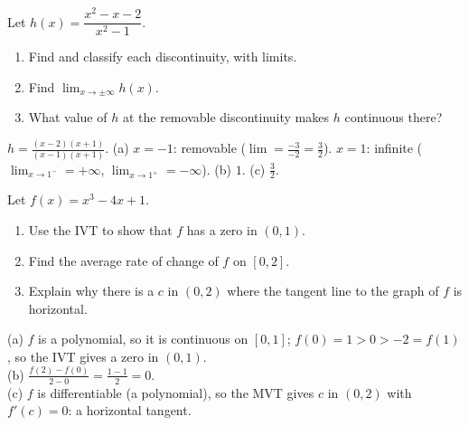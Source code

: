\begin{exo}{}
Let $h(x)=\dfrac{x^2-x-2}{x^2-1}$.
\begin{enumerate}[label=(\alph*)]
\item Find and classify each discontinuity, with limits.
\item Find $\lim_{x\to\pm\infty}h(x)$.
\item What value of $h$ at the removable discontinuity makes $h$ continuous there?
\end{enumerate}
\work{3.5cm}
\begin{solution}
$h=\frac{(x-2)(x+1)}{(x-1)(x+1)}$. (a) $x=-1$: removable ($\lim=\frac{-3}{-2}=\frac32$). $x=1$: infinite ($\lim_{x\to1^-}=+\infty$, $\lim_{x\to1^+}=-\infty$). (b) $1$. (c) $\frac32$.
\end{solution}
\end{exo}
\begin{exo}{}
Let $f(x)=x^3-4x+1$.
\begin{enumerate}[label=(\alph*)]
\item Use the IVT to show that $f$ has a zero in $(0,1)$.
\item Find the average rate of change of $f$ on $[0,2]$.
\item Explain why there is a $c$ in $(0,2)$ where the tangent line to the graph of $f$ is horizontal.
\end{enumerate}
\work{3.5cm}
\begin{solution}
(a) $f$ is a polynomial, so it is continuous on $[0,1]$; $f(0)=1>0>-2=f(1)$, so the IVT gives a zero in $(0,1)$.\\
(b) $\frac{f(2)-f(0)}{2-0}=\frac{1-1}{2}=0$.\\
(c) $f$ is differentiable (a polynomial), so the MVT gives $c$ in $(0,2)$ with $f'(c)=0$: a horizontal tangent.
\end{solution}
\end{exo}
